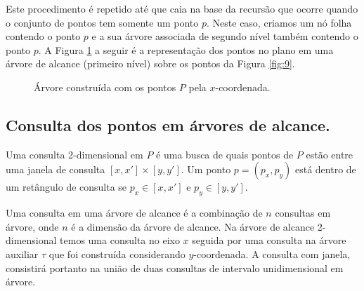 Este procedimento é repetido até que caia na base da recursão que ocorre quando o conjunto de pontos tem somente um ponto $p$. Neste caso, criamos um nó folha contendo o ponto $p$ e a sua árvore associada de segundo nível também contendo o ponto $p$. A Figura \ref{fig:11} a seguir é a representação dos pontos no plano em uma árvore de alcance (primeiro nível) sobre os pontos da Figura \ref{fig:9}.%

\begin{figure}[h!]

 \caption{Árvore construída com os pontos $P$ pela $x$-coordenada.}
 \label{fig:11}
\end{figure}

\subsection{Consulta dos pontos em árvores de alcance.}

Uma consulta 2-dimensional em $P$ é uma busca de quais pontos de $P$ estão entre uma janela de consulta $[x, x'] \times [y, y']$. Um ponto $p = (p_x, p_y)$ está dentro de um retângulo de consulta se $p_x \in [x, x']$ e $p_y \in [y, y']$. %

Uma consulta em uma árvore de alcance é a combinação de $n$ consultas em árvore, onde $n$ é a dimensão da árvore de alcance. Na árvore de alcance 2-dimensional temos uma consulta no eixo $x$ seguida por uma consulta na árvore auxiliar $\tau$ que foi construída considerando $y$-coordenada. A consulta com janela, consistirá portanto na união de duas consultas de intervalo unidimensional em árvore.

